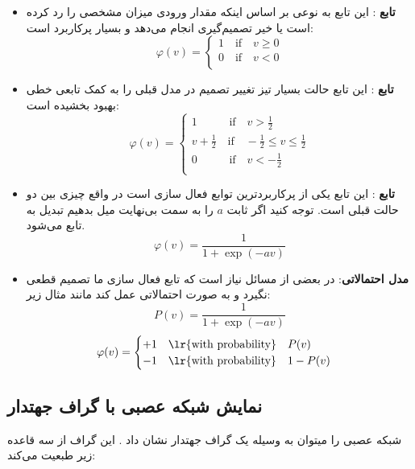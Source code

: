 \documentclass[11pt,a4paper,twocolumn]{article}
\begin{document}
\begin{itemize}
\item
\textbf{تابع }:
این تابع به نوعی بر اساس اینکه مقدار ورودی میزان مشخصی را رد کرده است یا خیر تصمیم‌گیری انجام می‌دهد و بسیار پرکاربرد است:
\[ \varphi(v) =
  \begin{cases}
    1\quad \text{if}\quad v \ge 0\\
    0\quad \text{if}\quad v < 0 \\
  \end{cases}
\]
\item
\textbf{تابع }:
این تابع حالت بسیار تیز تغییر تصمیم در مدل قبلی را به کمک تابعی خطی بهبود بخشیده است:
\[ \varphi(v) =
  \begin{cases}
    1\quad\quad\;\;\;\text{if}\quad v > \frac{1}{2}\\
    v+\frac{1}{2}\quad \text{if}\quad -\frac{1}{2} \le v \le \frac{1}{2} \\
    0\quad\quad\;\;\;\text{if}\quad v < -\frac{1}{2}\\
  \end{cases}
\]

\item
\textbf{تابع }:
این تابع یکی از پرکاربردترین توابع فعال سازی است در واقع چیزی بین دو حالت قبلی است. توجه کنید اگر ثابت $a$ را به سمت بی‌نهایت میل بدهیم تبدیل به تابع
می‌شود.
$$\varphi(v) = \frac{1}{1+\exp(-av)} $$

\item
\textbf{مدل احتمالاتی}:
در بعضی از مسائل نیاز است که تابع فعال سازی ما تصمیم قطعی نگیرد و به صورت احتمالاتی عمل کند مانند مثال زیر:
$$P	(v) = \frac{1}{1+\exp(-av)} $$
\[ \varphi(v) =
  \begin{cases}
    +1 \quad \text{\lr{with probability}} \quad P(v)\\
    -1 \quad \text{\lr{with probability}} \quad 1-P(v)\\
  \end{cases}
\]


\end{itemize}

\subsection{نمایش شبکه عصبی با گراف جهتدار}
 شبکه عصبی را میتوان به وسیله یک گراف جهتدار نشان داد . این گراف از سه قاعده زیر طبعیت می‌کند:
 
\end{document}
